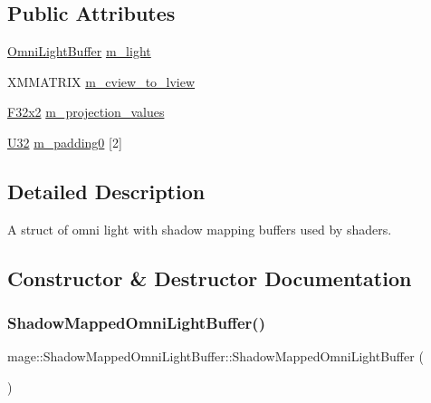 \subsection*{Public Attributes}
\begin{DoxyCompactItemize}
\item 
\hyperlink{structmage_1_1_omni_light_buffer}{Omni\+Light\+Buffer} \hyperlink{structmage_1_1_shadow_mapped_omni_light_buffer_a57133d97178c513c237ac71fa86a2594}{m\+\_\+light}
\item 
X\+M\+M\+A\+T\+R\+IX \hyperlink{structmage_1_1_shadow_mapped_omni_light_buffer_a3e31baf9bb0ba5f63199a1b84d7b43c9}{m\+\_\+cview\+\_\+to\+\_\+lview}
\item 
\hyperlink{namespacemage_aa87237ad091f5cd7da612b8523fc108f}{F32x2} \hyperlink{structmage_1_1_shadow_mapped_omni_light_buffer_a388cae8ff9e11f1e70c385941effc2d4}{m\+\_\+projection\+\_\+values}
\item 
\hyperlink{namespacemage_a41c104c036fba3756a74e19f793eeaa1}{U32} \hyperlink{structmage_1_1_shadow_mapped_omni_light_buffer_ac375ef915a213716b0a1f7789bd4bf15}{m\+\_\+padding0} \mbox{[}2\mbox{]}
\end{DoxyCompactItemize}


\subsection{Detailed Description}
A struct of omni light with shadow mapping buffers used by shaders. 

\subsection{Constructor \& Destructor Documentation}
\hypertarget{structmage_1_1_shadow_mapped_omni_light_buffer_af1283b0d5d9aab08b221d2053a3ab023}{}\label{structmage_1_1_shadow_mapped_omni_light_buffer_af1283b0d5d9aab08b221d2053a3ab023} 
\subsubsection{\texorpdfstring{Shadow\+Mapped\+Omni\+Light\+Buffer()}{ShadowMappedOmniLightBuffer()}\hspace{0.1cm}{\footnotesize\ttfamily [1/3]}}
{\footnotesize\ttfamily mage\+::\+Shadow\+Mapped\+Omni\+Light\+Buffer\+::\+Shadow\+Mapped\+Omni\+Light\+Buffer (\begin{DoxyParamCaption}{ }\end{DoxyParamCaption})\hspace{0.3cm}{\ttfamily [noexcept]}}


